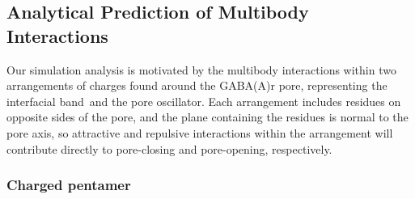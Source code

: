 \documentclass[journal=jacsat,manuscript=article]{achemso}
\newcommand{\fivering}{interfacial band~}
\newcommand{\fiveringnos}{interfacial band}
\newcommand{\triadns}{pore oscillator}
\begin{document}

\subsection{Analytical Prediction of Multibody Interactions\label{sec:theory}}
Our simulation analysis is motivated by the multibody interactions within two arrangements of charges found around the GABA(A)r pore, representing the \fivering and the \triadns. 
Each arrangement includes residues on opposite sides of the pore, and the plane containing the residues is normal to the pore axis, so attractive and repulsive interactions within the arrangement will contribute directly to pore-closing and pore-opening, respectively. %

\subsubsection*{Charged pentamer}
\newcommand{\side}{r}
\newcommand{\diag}{s}
\newcommand{\avgside}{\bar{\side}}
\newcommand{\avgdiag}{\bar{\diag}}
\newcommand{\avgsidevar}{\bar{\delta\side}^{2}}
\newcommand{\avgdiagvar}{\bar{\delta\diag}^{2}}
\end{document}
